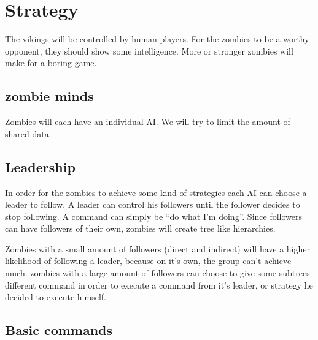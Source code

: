 \section{Strategy}

The vikings will be controlled by human players. For the zombies to be a worthy opponent, they should show some intelligence. More or stronger zombies will make for a boring game.

\subsection{zombie minds}
Zombies will each have an individual AI. We will try to limit the amount of shared data.

\subsection{Leadership}
In order for the zombies to achieve some kind of strategies each AI can choose a leader to follow. A leader can control his followers until the follower decides to stop following. A command can simply be ``do what I'm doing''. Since followers can have followers of their own, zombies will create tree like hierarchies.

Zombies with a small amount of followers (direct and indirect) will have a higher likelihood of following a leader, because on it's own, the group can't achieve much. zombies with a large amount of followers can choose to give some subtrees different command in order to execute a command from it's leader, or strategy he decided to execute himself.

\subsection{Basic commands}

\subsection{}
